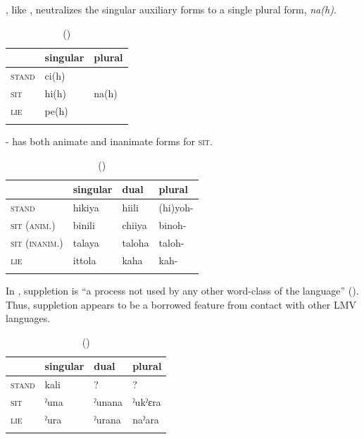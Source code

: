 \documentclass[output=paper]{LSP/langsci}
\begin{document}
, like , neutralizes the singular auxiliary forms to a single plural form, \emph{na(h)}.

\begin{table}
\caption{ (\citealt[32]{Swadesh1939})}
\begin{tabularx}{.5\textwidth}{ XXX}
\lsptoprule
& singular & plural \\
\midrule
\textsc{stand} & ci(h) &  \\
\textsc{sit} & hi(h) & na(h) \\
 \textsc{lie} & pe(h) &  \\
\lspbottomrule
\end{tabularx}
\end{table}

- has both animate and inanimate forms for \textsc{sit}.

\begin{table}
\caption{ (\citealt[3]{Broadwell2006})}
\begin{tabularx}{.75\textwidth}{lXXX}
\lsptoprule
 & singular & dual & plural \\
\midrule
\textsc{stand} & hikiya & hiili & (hi)yoh- \\
\textsc{sit (anim.)} & binili & chiiya & binoh- \\
\textsc{sit (inanim.)} & talaya & taloha & taloh- \\
 \textsc{lie} & ittola & kaha & kah- \\
\lspbottomrule
\end{tabularx} 
\end{table}

In , suppletion is “a process not used by any other word-class of the language” (\citealt[40]{Haas1946}). Thus,  suppletion appears to be a borrowed feature from contact with other LMV languages.

\begin{table}
\caption{ (\citealt[40]{Haas1946})}
\begin{tabularx}{.75\textwidth}{XXXX}
\lsptoprule
&  {singular} &  {dual} &  {plural} \\
\midrule
 \textsc{stand} & kali & ? & ? \\
\textsc{sit} & ˀuna & ˀunana & ˀukˀɛra \\
\textsc{lie} & ˀura & ˀurana & naˀara \\
\lspbottomrule
\end{tabularx} 
\end{table}
\end{document}
